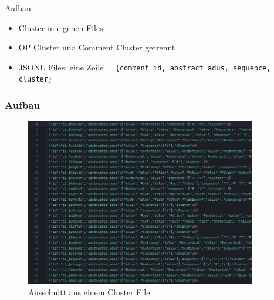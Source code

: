 \documentclass[compress,12pt]{beamer}
\begin{document}
    \begin{frame}{Aufbau}
        \begin{itemize}
            \item Cluster in eigenen Files
            \item OP Cluster und Comment Cluster getrennt
            \item JSONL Files: eine Zeile = \texttt{\{comment\_id, abstract\_adus, sequence, cluster\}}
        \end{itemize}
    \end{frame}

    \begin{frame}[plain]
        \frametitle{Aufbau}
        \begin{figure}
            \centering
            \includegraphics[width=0.9\textwidth]{../images/cluster-file-example}
            \caption{Ausschnitt aus einem Cluster File}
            \label{fig:cluster-file-example}
        \end{figure}
    \end{frame}
\end{document}
